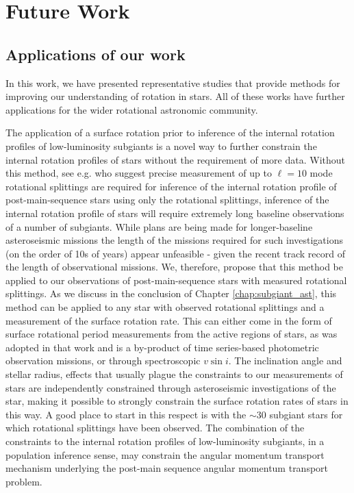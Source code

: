\section{Future Work}

\subsection{Applications of our work}

In this work, we have presented representative studies that provide methods for improving our understanding of rotation in stars.
All of these works have further applications for the wider rotational astronomic community.

The application of a surface rotation prior to inference of the internal rotation profiles of low-luminosity subgiants is a novel way to further constrain the internal rotation profiles of stars without the requirement of more data.
Without this method, see e.g. \citet{ahlborn_asteroseismic_2020} who suggest precise measurement of up to $\ell = 10$ mode rotational splittings are required for inference of the internal rotation profile of post-main-sequence stars using only the rotational splittings, inference of the internal rotation profile of stars will require extremely long baseline observations of a number of subgiants.
While plans are being made for longer-baseline asteroseismic missions \citep{rauer_plato_2014, akeson_wide_2019, miglio_haydn_2021} the length of the missions required for such investigations (on the order of 10s of years) appear unfeasible - given the recent track record of the length of observational missions.
We, therefore, propose that this method be applied to our observations of post-main-sequence stars with measured rotational splittings.
As we discuss in the conclusion of Chapter \ref{chap:subgiant_ast}, this method can be applied to any star with observed rotational splittings and a measurement of the surface rotation rate.
This can either come in the form of surface rotational period measurements from the active regions of stars, as was adopted in that work and is a by-product of time series-based photometric observation missions, or through spectroscopic $v \sin{i}$.
The inclination angle and stellar radius, effects that usually plague the constraints to our measurements of stars are independently constrained through asteroseismic investigations of the star, making it possible to strongly constrain the surface rotation rates of stars in this way.
A good place to start in this respect is with the $\sim$30 subgiant stars for which rotational splittings have been observed.
The combination of the constraints to the internal rotation profiles of low-luminosity subgiants, in a population inference sense, may constrain the angular momentum transport mechanism underlying the post-main sequence angular momentum transport problem.

